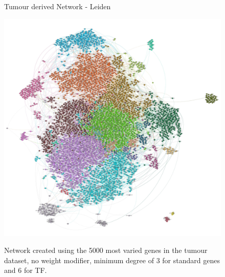 \newpage
{}
\begin{figure}[p]
  \thispagestyle{empty} %
  \centering
  \captionsetup{justification=centering, labelfont=bf}
    \parbox{\textwidth}{\centering \Huge Tumour derived Network - Leiden\vspace{0.5cm} } 
    \label{fig:N_I:tum_net}
  \includegraphics[width=0.9\paperwidth, keepaspectratio]{Sections/Network_pages/images/tum_std_4K_6TF_lowRes.jpg} %
  \parbox{0.8\textwidth}{Network created using the 5000 most varied genes in the tumour dataset, no weight modifier, minimum degree of 3 for standard genes and 6 for TF.}
\end{figure}
\restoregeometry
\newpage
